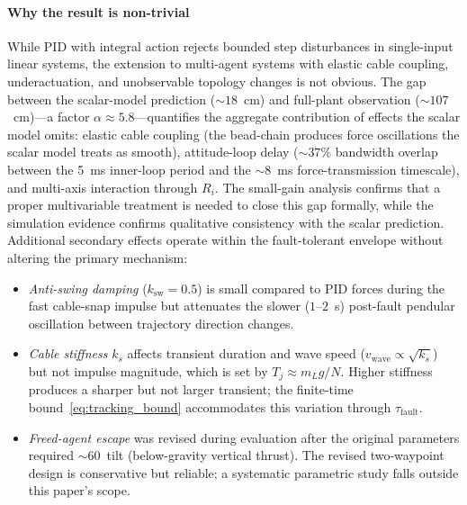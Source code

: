 \paragraph*{Why the result is non-trivial}
While PID with integral action rejects bounded step disturbances in single-input linear systems, the extension to multi-agent systems with elastic cable coupling, underactuation, and unobservable topology changes is not obvious. The gap between the scalar-model prediction (${\sim}18$~cm) and full-plant observation (${\sim}107$~cm)---a factor $\alpha \approx 5.8$---quantifies the aggregate contribution of effects the scalar model omits: elastic cable coupling (the bead-chain produces force oscillations the scalar model treats as smooth), attitude-loop delay (${\sim}37\%$ bandwidth overlap between the 5~ms inner-loop period and the ${\sim}8$~ms force-transmission timescale), and multi-axis interaction through $R_i$. The small-gain analysis confirms that a proper multivariable treatment is needed to close this gap formally, while the simulation evidence confirms qualitative consistency with the scalar prediction. Additional secondary effects operate within the fault-tolerant envelope without altering the primary mechanism:
%
\begin{itemize}
  \item \emph{Anti-swing damping} ($k_{\mathrm{sw}} = 0.5$) is small compared to PID forces during the fast cable-snap impulse but attenuates the slower ($1$--$2$~s) post-fault pendular oscillation between trajectory direction changes.
  \item \emph{Cable stiffness} $k_s$ affects transient duration and wave speed ($v_{\mathrm{wave}} \propto \sqrt{k_s}$) but not impulse magnitude, which is set by $T_j \approx m_L g / N$. Higher stiffness produces a sharper but not larger transient; the finite-time bound~\eqref{eq:tracking_bound} accommodates this variation through $\tau_{\mathrm{fault}}$.
  \item \emph{Freed-agent escape} was revised during evaluation after the original parameters required ${\sim}60$\textdegree\ tilt (below-gravity vertical thrust). The revised two-waypoint design is conservative but reliable; a systematic parametric study falls outside this paper's scope.
\end{itemize}


